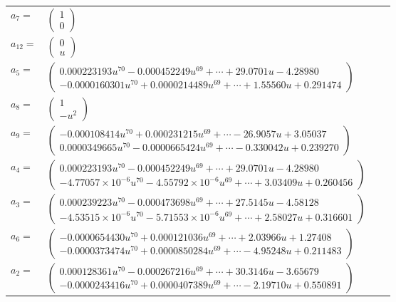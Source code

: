 \documentclass[1p]{elsarticle_modified}
\theoremstyle{definition}
\begin{document}
\begin{tabular}{m{7pt} m{180pt} m{7pt} m{180pt} }
\flushright $a_{7}=$&$\begin{pmatrix}1\\0\end{pmatrix}$ \\
\flushright $a_{12}=$&$\begin{pmatrix}0\\u\end{pmatrix}$ \\
\flushright $a_{5}=$&$\begin{pmatrix}0.000223193 u^{70}-0.000452249 u^{69}+\cdots+29.0701 u-4.28980\\-0.0000160301 u^{70}+0.0000214489 u^{69}+\cdots+1.55560 u+0.291474\end{pmatrix}$ \\
\flushright $a_{8}=$&$\begin{pmatrix}1\\- u^2\end{pmatrix}$ \\
\flushright $a_{9}=$&$\begin{pmatrix}-0.000108414 u^{70}+0.000231215 u^{69}+\cdots-26.9057 u+3.05037\\0.0000349665 u^{70}-0.0000665424 u^{69}+\cdots-0.330042 u+0.239270\end{pmatrix}$ \\
\flushright $a_{4}=$&$\begin{pmatrix}0.000223193 u^{70}-0.000452249 u^{69}+\cdots+29.0701 u-4.28980\\-4.77057\times10^{-6} u^{70}-4.55792\times10^{-6} u^{69}+\cdots+3.03409 u+0.260456\end{pmatrix}$ \\
\flushright $a_{3}=$&$\begin{pmatrix}0.000239223 u^{70}-0.000473698 u^{69}+\cdots+27.5145 u-4.58128\\-4.53515\times10^{-6} u^{70}-5.71553\times10^{-6} u^{69}+\cdots+2.58027 u+0.316601\end{pmatrix}$ \\
\flushright $a_{6}=$&$\begin{pmatrix}-0.0000654430 u^{70}+0.000121036 u^{69}+\cdots+2.03966 u+1.27408\\-0.0000373474 u^{70}+0.0000850284 u^{69}+\cdots-4.95248 u+0.211483\end{pmatrix}$ \\
\flushright $a_{2}=$&$\begin{pmatrix}0.000128361 u^{70}-0.000267216 u^{69}+\cdots+30.3146 u-3.65679\\-0.0000243416 u^{70}+0.0000407389 u^{69}+\cdots-2.19710 u+0.550891\end{pmatrix}$ \\

\end{tabular}
\end{document}
